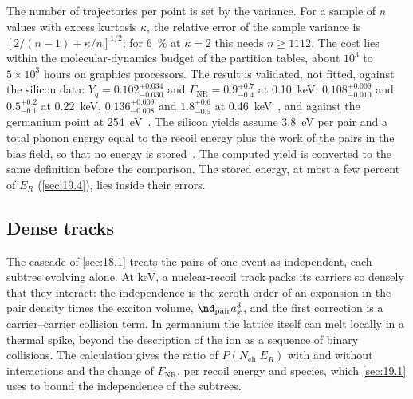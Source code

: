 The number of trajectories per point is set by the variance. For a sample of $n$ values with excess kurtosis $\kappa$, the relative error of the sample variance is $[2/(n - 1) + \kappa/n]^{1/2}$; for \SI{6}{\percent} at $\kappa = 2$ this needs $n \ge 1112$. The cost lies within the molecular-dynamics budget of the partition tables, about $10^3$ to $5\times10^3$ hours on graphics processors. The result is validated, not fitted, against the silicon data: $Y_q = 0.102^{+0.034}_{-0.030}$ and $F_{\mathrm{NR}} = 0.9^{+0.7}_{-0.4}$ at \SI{0.10}{keV}, $0.108^{+0.009}_{-0.010}$ and $0.5^{+0.2}_{-0.1}$ at \SI{0.22}{keV}, $0.136^{+0.009}_{-0.008}$ and $1.8^{+0.6}_{-0.5}$ at \SI{0.46}{keV}~\cite[Table~II]{albakry2023first}, and against the germanium point at \SI{254}{eV}~\cite{kavner2024measurement}. The silicon yields assume \SI{3.8}{eV} per pair and a total phonon energy equal to the recoil energy plus the work of the pairs in the bias field, so that no energy is stored~\cite[Eq.~(1)]{albakry2023first}. The computed yield is converted to the same definition before the comparison. The stored energy, at most a few percent of $E_R$ (\cref{sec:19.4}), lies inside their errors.

\subsection{Dense tracks}

The cascade of \cref{sec:18.1} treats the pairs of one event as independent, each subtree evolving alone. At keV, a nuclear-recoil track packs its carriers so densely that they interact: the independence is the zeroth order of an expansion in the pair density times the exciton volume, $\nd_{\mathrm{pair}}a_x^3$, and the first correction is a carrier--carrier collision term. In germanium the lattice itself can melt locally in a thermal spike, beyond the description of the ion as a sequence of binary collisions. The calculation gives the ratio of $P(N_{\mathrm{eh}}|E_R)$ with and without interactions and the change of $F_{\mathrm{NR}}$, per recoil energy and species, which \cref{sec:19.1} uses to bound the independence of the subtrees.

